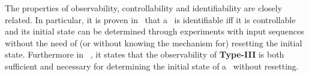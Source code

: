 


The properties of observability, controllability and identifiability are closely related. In particular, it is proven in~\cite{Cheng2011Identification} that a \BCN\ is identifiable iff  it is controllable and its initial state can be determined through experiments with input sequences without the need of (or without knowing the mechanism for) resetting the initial state. Furthermore in ~\cite{Cheng2011Identification}, it states that the observability of  {\bf Type-III}  is both sufficient and necessary for determining the initial state of a \BCN\  without  resetting.  

